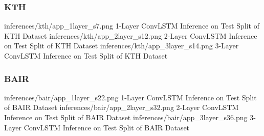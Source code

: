 \documentclass{scrartcl}
\begin{document}
\subsubsection{KTH}
\label{subsubsec:additional_kth_inferences}

\threefig
{inferences/kth/app_1layer_s7.png}
{1-Layer ConvLSTM Inference on Test Split of KTH Dataset}
{inferences/kth/app_2layer_s12.png}
{2-Layer ConvLSTM Inference on Test Split of KTH Dataset}
{inferences/kth/app_3layer_s14.png}
{3-Layer ConvLSTM Inference on Test Split of KTH Dataset}

\subsubsection{BAIR}
\label{subsubsec:additional_bair_inferences}

\threefig
{inferences/bair/app_1layer_s22.png}
{1-Layer ConvLSTM Inference on Test Split of BAIR Dataset}
{inferences/bair/app_2layer_s32.png}
{2-Layer ConvLSTM Inference on Test Split of BAIR Dataset}
{inferences/bair/app_3layer_s36.png}
{3-Layer ConvLSTM Inference on Test Split of BAIR Dataset}
\end{document}
